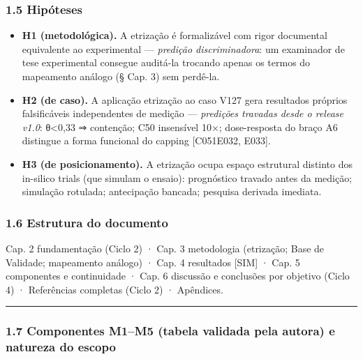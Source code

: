 \documentclass[
  10pt,
]{article}
\providecommand{\tightlist}{%
  \setlength{\itemsep}{0pt}\setlength{\parskip}{0pt}}
\begin{document}
\hypertarget{hipuxf3teses}{%
\subsubsection{1.5 Hipóteses}\label{hipuxf3teses}}

\begin{itemize}
\tightlist
\item
  \textbf{H1 (metodológica).} A etrização é formalizável com rigor
  documental equivalente ao experimental --- \emph{predição
  discriminadora}: um examinador de tese experimental consegue auditá-la
  trocando apenas os termos do mapeamento análogo (§ Cap. 3) sem
  perdê-la.
\item
  \textbf{H2 (de caso).} A aplicação etrização ao caso V127 gera
  resultados próprios falsificáveis independentes de medição ---
  \emph{predições travadas desde o release v1.0}: θ\textless0,33 ⇒
  contenção; C50 insensível 10×; dose-resposta do braço A6 distingue a
  forma funcional do capping {[}C051\textbar E032, E033{]}.
\item
  \textbf{H3 (de posicionamento).} A etrização ocupa espaço estrutural
  distinto dos in-silico trials (que simulam o ensaio): prognóstico
  travado antes da medição; simulação rotulada; antecipação bancada;
  pesquisa derivada imediata.
\end{itemize}

\hypertarget{estrutura-do-documento}{%
\subsubsection{1.6 Estrutura do
documento}\label{estrutura-do-documento}}

Cap. 2 fundamentação (Ciclo 2) · Cap. 3 metodologia (etrização; Base de
Validade; mapeamento análogo) · Cap. 4 resultados {[}SIM{]} · Cap. 5
componentes e continuidade · Cap. 6 discussão e conclusões por objetivo
(Ciclo 4) · Referências completas (Ciclo 2) · Apêndices.

\begin{center}\rule{0.5\linewidth}{0.5pt}\end{center}

\hypertarget{componentes-m1m5-tabela-validada-pela-autora-e-natureza-do-escopo}{%
\subsubsection{1.7 Componentes M1--M5 (tabela validada pela autora) e
natureza do
escopo}\label{componentes-m1m5-tabela-validada-pela-autora-e-natureza-do-escopo}}
\end{document}
